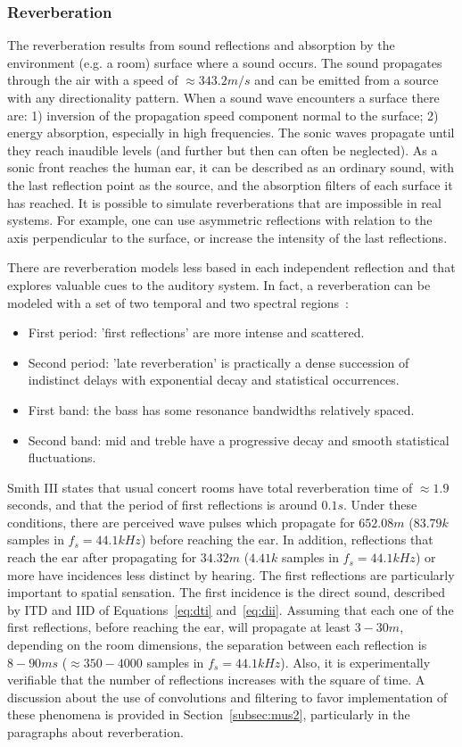 \subsubsection{Reverberation}
The reverberation results from sound reflections and absorption by the environment (e.g. a room) surface where a sound occurs.
The sound propagates through the air with a speed of $\approx 343.2m/s$ and can be emitted from a source with any directionality pattern. When a sound wave encounters a surface there are: 1) inversion of the propagation speed component normal to the surface;  2) energy absorption, especially in high frequencies.
The sonic waves propagate until they reach inaudible levels (and further but then can often be neglected).
As a sonic front reaches the human ear, it can be described as an ordinary sound, with the last reflection point as the source, and the absorption filters of each surface it has reached.
It is possible to simulate reverberations that are impossible in real systems. For example, one can use asymmetric reflections with relation to the axis perpendicular to the surface, or increase the intensity of the last reflections.

There are reverberation models less based in each independent reflection and that explores valuable cues to the auditory system. In fact, a reverberation can be modeled with a set of two temporal and two spectral regions~\cite{JOSPhy}:
\begin{itemize}
   \item First period: 'first reflections' are more intense and scattered.
   \item Second period: 'late reverberation' is practically a dense succession of indistinct delays with exponential decay and statistical occurrences.
   \item First band: the bass has some resonance bandwidths relatively spaced.
   \item Second band: mid and treble have a progressive decay and smooth statistical fluctuations.
\end{itemize}

Smith III states that usual concert rooms have total reverberation time of $\approx 1.9$ seconds, and that the period of first reflections is around $0.1s$.
Under these conditions, there are perceived wave pulses which propagate for $652.08m$ ($83.79k$ samples in $f_s=44.1kHz$) before reaching the ear. In addition, reflections that reach the ear after propagating  for $34.32m$ ($4.41k$ samples in $f_s=44.1kHz$) or more have incidences less distinct by hearing. The first reflections are particularly important to spatial sensation. The first incidence is the direct sound, described by ITD and IID of Equations~\ref{eq:dti} and~\ref{eq:dii}. Assuming that each one of the first reflections, before reaching the ear, will propagate at least $3-30m$, depending on the room dimensions, the separation between each reflection is $8-90ms$ ($\approx 350-4000$ samples in $f_s=44.1kHz$).
Also, it is experimentally verifiable that the number of reflections increases with the square of time.
A discussion about the use of convolutions and filtering to favor implementation of these phenomena is provided in Section~\ref{subsec:mus2}, particularly in the paragraphs about reverberation.


